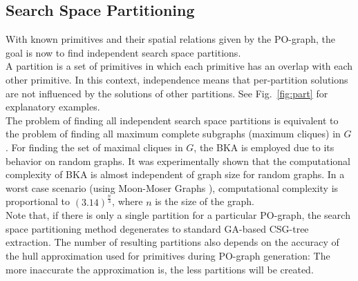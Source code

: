 \subsection{Search Space Partitioning}
With known primitives and their spatial relations given by the \ac{PO}-graph, the goal is now to find independent search space partitions. 
\\
A partition is a set of primitives in which each primitive has an overlap with each other primitive.
In this context, independence means that per-partition solutions are not influenced by the solutions of other partitions.
See Fig.~\ref{fig:part} for explanatory examples. 
\\
The problem of finding all independent search space partitions is equivalent to the problem of finding all maximum complete subgraphs (maximum cliques) in $G$.
For finding the set of maximal cliques in $G$, the \ac{BKA}\cite{bron1973cliques} is employed due to its behavior on random graphs.
It was experimentally shown \cite{bron1973cliques} that the computational complexity of \ac{BKA} is almost independent of graph size for random graphs.
In a worst case scenario (using Moon-Moser Graphs \cite{moon1965cliques}), computational complexity is proportional to $(3.14)^{\frac{n}{3}}$, where $n$ is the size of the graph.
\\
Note that, if there is only a single partition for a particular \ac{PO}-graph, the search space partitioning method degenerates to standard \ac{GA}-based \ac{CSG}-tree extraction. 
The number of resulting partitions also depends on the accuracy of the hull approximation used for primitives during \ac{PO}-graph generation: 
The more inaccurate the approximation is, the less partitions will be created.

